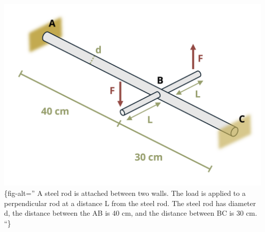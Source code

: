 \documentclass[
  letterpaper,
  DIV=11,
  numbers=noendperiod]{scrreprt}
\begin{document}
\includegraphics{images/287.png}\{fig-alt='' A steel rod is attached
between two walls. The load is applied to a perpendicular rod at a
distance L from the steel rod. The steel rod has diameter d, the
distance between the AB is 40 cm, and the distance between BC is 30 cm.
``\}
\end{document}
